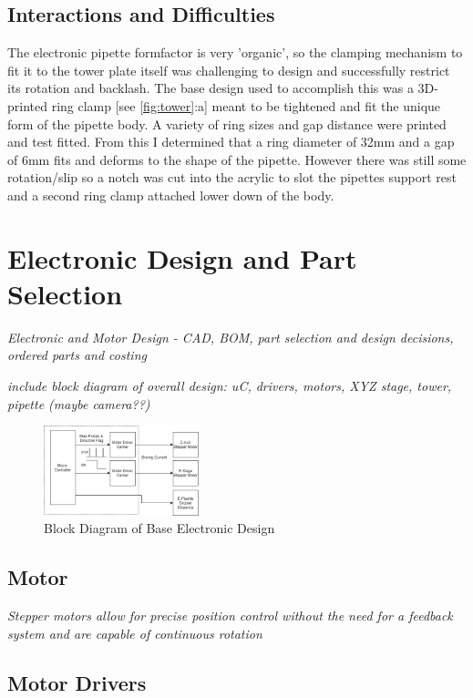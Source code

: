 \subsection{Interactions and Difficulties}
The electronic pipette formfactor is very 'organic', so the clamping mechanism to fit it to the tower plate itself was challenging to design and successfully restrict its rotation and backlash.  
The base design used to accomplish this was a 3D-printed ring clamp [see \ref{fig:tower}:a] meant to be tightened and fit the unique form of the pipette body. A variety of ring sizes and gap distance were printed and test fitted. From this I determined that a ring diameter of 32mm and a gap of 6mm fits and deforms to the shape of the pipette. However there was still some rotation/slip so a notch was cut into the acrylic to slot the pipettes support rest and a second ring clamp attached lower down of the body. 

\section{Electronic Design and Part Selection}
\textit{Electronic and Motor Design - CAD, BOM, part selection and design decisions, ordered parts and costing}

\textit{include block diagram of overall design: uC, drivers, motors, XYZ stage, tower, pipette (maybe camera??)}

\begin{figure}[h]
    \centering
    \includegraphics[width=0.4\textwidth]{img/ED_block_diag.png}
    \caption{Block Diagram of Base Electronic Design}
    \label{fig:e_block}
\end{figure}

\subsection{Motor}
\textit{Stepper motors allow for precise position control without the need for a feedback system and are capable of continuous rotation}
\subsection{Motor Drivers}

